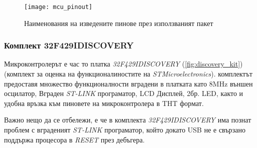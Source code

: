 \begin{figure}[htpb!]
    \centering
    \texttt{[image: mcu\_pinout]}
    \caption{Наименования на изведените пинове през използваният пакет}
    \label{fig:mcu_pinout}
\end{figure}

\subsubsection{Комплект 32F429IDISCOVERY}

Микроконтролерът е час то платка \textit{32F429IDISCOVERY} (\autoref{fig:discovery_kit})
(комплект за оценка на функционалиностите на \textit{STMicroelectronics}).
комплектът предоставя множество функционалности вградени в платката като
8MHz външен осцилатор, Вграден \textit{ST-LINK} програматор,
LCD Дисплей, 2бр. LED, както и удобна връзка към пиновете на
микроконтролера в THT формат.

Важно нещо да се отбележи, е че в комплекта \textit{32F429IDISCOVERY}
има познат проблем с вграденият \textit{ST-LINK} програматор,
който докато USB не е свързано поддържа процесора в \textit{RESET}
през дебъгера.

\FloatBarrier

